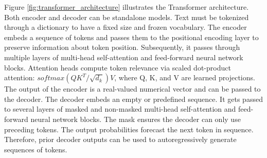 Figure \ref{fig:transformer_architecture} illustrates the Transformer architecture. Both encoder and decoder can be standalone models. Text must be tokenized through a dictionary to have a fixed size and frozen vocabulary.
The encoder embeds a sequence of tokens and passes them to the positional encoding layer to preserve information about token position. Subsequently, it passes through multiple layers of multi-head self-attention and feed-forward neural network blocks. Attention heads compute token relevance via scaled dot-product attention: $softmax(QK^T/\sqrt{d_k})V$, where Q, K, and V are learned projections. The output of the encoder is a real-valued numerical vector and can be passed to the decoder.
The decoder embeds an empty or predefined sequence. It gets passed to several layers of masked and non-masked multi-head self-attention and feed-forward neural network blocks. The mask ensures the decoder can only use preceding tokens. The output probabilities forecast the next token in sequence. Therefore, prior decoder outputs can be used to autoregressively generate sequences of tokens.






